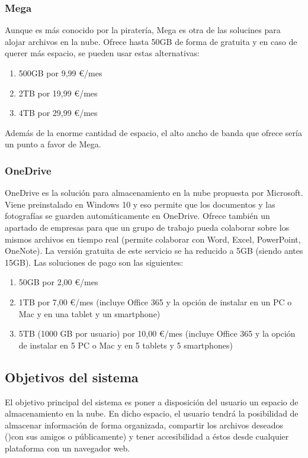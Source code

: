 \hfill\begin{minipage}{\dimexpr\textwidth-1cm}
\subsubsection{Mega \cite{cita_mega}}
Aunque es más conocido por la piratería, Mega es otra de las solucines para alojar archivos en la nube. Ofrece hasta 50GB de forma de gratuita y en caso de querer más espacio, se pueden usar estas alternativas:
\begin{enumerate}[label=(\alph*)]
	\item 500GB por 9,99 \euro/mes
	\item 2TB por 19,99 \euro/mes
	\item 4TB por 29,99 \euro/mes
\end{enumerate}
Además de la enorme cantidad de espacio, el alto ancho de banda que ofrece sería un punto a favor de Mega. \\
\end{minipage}

\hfill\begin{minipage}{\dimexpr\textwidth-1cm}
\subsubsection{OneDrive \cite{cita_onedrive}}
OneDrive es la solución para almacenamiento en la nube propuesta por Microsoft. Viene preinstalado en Windows 10 y eso permite que los documentos y las fotografías se guarden automáticamente en OneDrive. Ofrece también un apartado de empresas para que un grupo de trabajo pueda colaborar sobre los mismos archivos en tiempo real (permite colaborar con Word, Excel, PowerPoint, OneNote).
La versión gratuita de este servicio se ha reducido a 5GB (siendo antes 15GB). Las soluciones de pago son las siguientes:
\begin{enumerate}[label=(\alph*)]
	\item 50GB por 2,00 \euro/mes
	\item 1TB por 7,00 \euro/mes (incluye Office 365 y la opción de instalar en un PC o Mac y en una tablet y un smartphone)
	\item 5TB (1000 GB por usuario) por 10,00 \euro/mes (incluye Office 365 y la opción de instalar en 5 PC o Mac y en 5 tablets y 5 smartphones)
\end{enumerate}
\end{minipage}

\subsection{Objetivos del sistema}
El objetivo principal del sistema es poner a disposición del usuario un espacio de almacenamiento en la nube. En dicho espacio, el usuario tendrá la posibilidad de almacenar información de forma organizada, compartir los archivos deseados ()con sus amigos o públicamente) y tener accesibilidad a éstos desde cualquier plataforma con un navegador web. \\

